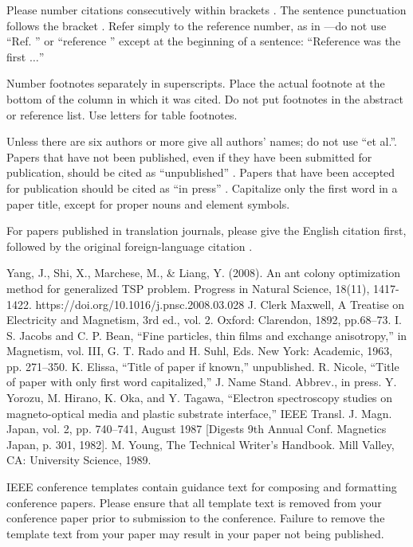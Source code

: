 \documentclass[conference]{IEEEtran}
\begin{document}
Please number citations consecutively within brackets \cite{b1}. The 
sentence punctuation follows the bracket \cite{b2}. Refer simply to the reference 
number, as in \cite{b3}---do not use ``Ref. \cite{b3}'' or ``reference \cite{b3}'' except at 
the beginning of a sentence: ``Reference \cite{b3} was the first $\ldots$''

Number footnotes separately in superscripts. Place the actual footnote at 
the bottom of the column in which it was cited. Do not put footnotes in the 
abstract or reference list. Use letters for table footnotes.

Unless there are six authors or more give all authors' names; do not use 
``et al.''. Papers that have not been published, even if they have been 
submitted for publication, should be cited as ``unpublished'' \cite{b4}. Papers 
that have been accepted for publication should be cited as ``in press'' \cite{b5}. 
Capitalize only the first word in a paper title, except for proper nouns and 
element symbols.

For papers published in translation journals, please give the English 
citation first, followed by the original foreign-language citation \cite{b6}.

\begin{thebibliography}{00}

 Yang, J., Shi, X., Marchese, M., & Liang, Y. (2008). An ant colony optimization method for generalized TSP problem. Progress in Natural Science, 18(11), 1417-1422. https://doi.org/10.1016/j.pnsc.2008.03.028
 J. Clerk Maxwell, A Treatise on Electricity and Magnetism, 3rd ed., vol. 2. Oxford: Clarendon, 1892, pp.68--73.
 I. S. Jacobs and C. P. Bean, ``Fine particles, thin films and exchange anisotropy,'' in Magnetism, vol. III, G. T. Rado and H. Suhl, Eds. New York: Academic, 1963, pp. 271--350.
 K. Elissa, ``Title of paper if known,'' unpublished.
 R. Nicole, ``Title of paper with only first word capitalized,'' J. Name Stand. Abbrev., in press.
 Y. Yorozu, M. Hirano, K. Oka, and Y. Tagawa, ``Electron spectroscopy studies on magneto-optical media and plastic substrate interface,'' IEEE Transl. J. Magn. Japan, vol. 2, pp. 740--741, August 1987 [Digests 9th Annual Conf. Magnetics Japan, p. 301, 1982].
 M. Young, The Technical Writer's Handbook. Mill Valley, CA: University Science, 1989.
\end{thebibliography}
\vspace{12pt}
\color{red}
IEEE conference templates contain guidance text for composing and formatting conference papers. Please ensure that all template text is removed from your conference paper prior to submission to the conference. Failure to remove the template text from your paper may result in your paper not being published.
\end{document}
